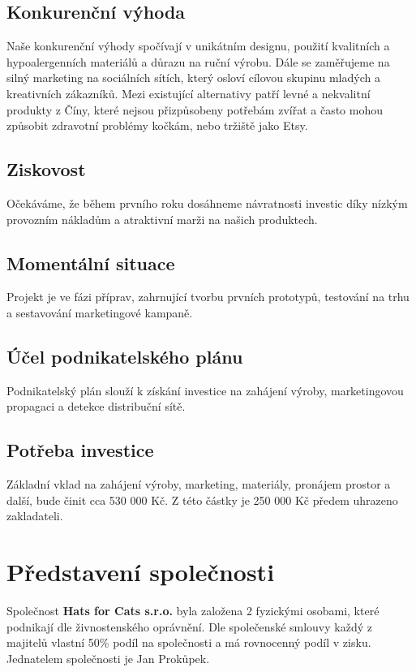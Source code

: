 \documentclass[12pt, a4paper]{article}
\begin{document}
\subsection{Konkurenční výhoda}
Naše konkurenční výhody spočívají v unikátním designu, použití kvalitních a hypoalergenních materiálů a důrazu na ruční výrobu. Dále se zaměřujeme na silný marketing na sociálních sítích, který osloví cílovou skupinu mladých a kreativních zákazníků.
Mezi existující alternativy patří levné a nekvalitní produkty z Číny, které nejsou přizpůsobeny potřebám zvířat a často mohou
způsobit zdravotní problémy kočkám, nebo tržiště jako Etsy.

\subsection{Ziskovost}
Očekáváme, že během prvního roku dosáhneme návratnosti investic díky 
nízkým provozním nákladům 
a atraktivní marži na našich produktech.

\subsection{Momentální situace}
Projekt je ve fázi příprav, zahrnující tvorbu prvních prototypů, 
testování na trhu a sestavování marketingové kampaně.

\subsection{Účel podnikatelského plánu}
Podnikatelský plán slouží k získání investice na zahájení výroby, 
marketingovou propagaci a detekce distribuční sítě.

\subsection{Potřeba investice}
Základní vklad na zahájení výroby, marketing, materiály,
pronájem prostor a další, bude činit cca 530 000 Kč.
Z této částky je 250 000 Kč předem uhrazeno zakladateli.

\section{Představení společnosti}
Společnost \textbf{Hats for Cats s.r.o.} byla založena 2 fyzickými osobami,
které podnikají dle živnostenského oprávnění. Dle společenské smlouvy
každý z majitelů vlastní 50\% podíl na společnosti a má rovnocenný podíl v zisku.
Jednatelem společnosti je Jan Prokůpek.
\end{document}
